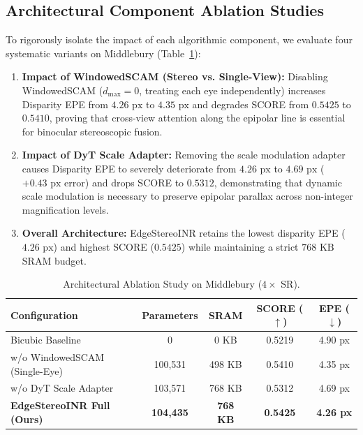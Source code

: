 \documentclass[10pt,journal,compsoc]{IEEEtran}
\begin{document}
\subsection{Architectural Component Ablation Studies}
To rigorously isolate the impact of each algorithmic component, we evaluate four systematic variants on Middlebury (Table~\ref{tab:ablation_study}):
\begin{enumerate}
    \item \textbf{Impact of WindowedSCAM (Stereo vs. Single-View):} Disabling WindowedSCAM ($d_{\max} = 0$, treating each eye independently) increases Disparity EPE from $4.26\text{ px}$ to $4.35\text{ px}$ and degrades SCORE from $0.5425$ to $0.5410$, proving that cross-view attention along the epipolar line is essential for binocular stereoscopic fusion.
    \item \textbf{Impact of DyT Scale Adapter:} Removing the scale modulation adapter causes Disparity EPE to severely deteriorate from $4.26\text{ px}$ to $4.69\text{ px}$ ($+0.43\text{ px}$ error) and drops SCORE to $0.5312$, demonstrating that dynamic scale modulation is necessary to preserve epipolar parallax across non-integer magnification levels.
    \item \textbf{Overall Architecture:} EdgeStereoINR retains the lowest disparity EPE ($4.26\text{ px}$) and highest SCORE ($0.5425$) while maintaining a strict $768\text{ KB}$ SRAM budget.
\end{enumerate}

\begin{table}[h]
\centering
\caption{Architectural Ablation Study on Middlebury ($4\times$ SR).}
\label{tab:ablation_study}
\begin{tabular}{lcccc}
\toprule
Configuration & Parameters & SRAM & SCORE ($\uparrow$) & EPE ($\downarrow$) \\
\midrule
Bicubic Baseline & 0 & 0 KB & 0.5219 & 4.90 px \\
w/o WindowedSCAM (Single-Eye) & 100,531 & 498 KB & 0.5410 & 4.35 px \\
w/o DyT Scale Adapter & 103,571 & 768 KB & 0.5312 & 4.69 px \\
\midrule
\textbf{EdgeStereoINR Full (Ours)} & \textbf{104,435} & \textbf{768 KB} & \textbf{0.5425} & \textbf{4.26 px} \\
\bottomrule
\end{tabular}
\end{table}
\end{document}
